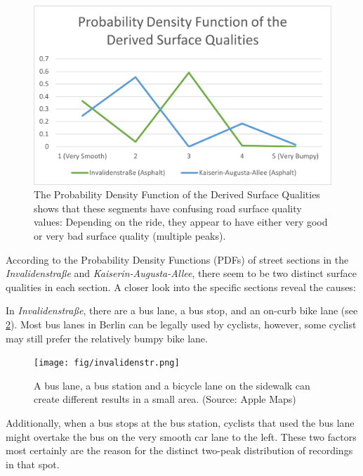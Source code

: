 \begin{figure}
    \centering
    \includegraphics[width=\columnwidth]{fig/pdf_mixed.png}
    \caption{%
        The Probability Density Function of the Derived Surface Qualities shows that these segments have confusing road surface quality values: Depending on the ride, they appear to have either very good or very bad surface quality (multiple peaks).
    }%
    \label{fig:mixed}
\end{figure}

According to the Probability Density Functions (PDFs) of street sections in the \textit{Invalidenstraße} and \textit{Kaiserin-Augusta-Allee}, there seem to be two distinct surface qualities in each section.
A closer look into the specific sections reveal the causes:
 
\begin{table}%
\centering
\caption{Surface Quality Analysis Evaluation Results Showing Mean, Median and Standard Deviation of Sections With Mixed Results}%
\label{tab:mixed}
\end{table}

In \textit{Invalidenstraße}, there are a bus lane, a bus stop, and an on-curb bike lane (see \cref{fig:invaliden}).
Most bus lanes in Berlin can be legally used by cyclists, however, some cyclist may still prefer the relatively bumpy bike lane.
\begin{figure}
    \centering
    \texttt{[image: fig/invalidenstr.png]}
    \caption{%
        A bus lane, a bus station and a bicycle lane on the sidewalk can create different results in a small area. (Source: Apple Maps)
    }%
    \label{fig:invaliden}
\end{figure}
Additionally, when a bus stops at the bus station, cyclists that used the bus lane might overtake the bus on the very smooth car lane to the left. 
These two factors most certainly are the reason for the distinct two-peak distribution of recordings in that spot.

